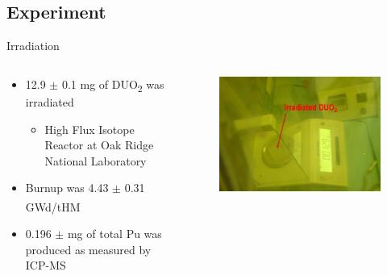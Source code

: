 \documentclass{beamer}
\newcommand{\tss}{\textsuperscript}
\newcommand{\tsbs}{\textsubscript}
\begin{document}
\subsection{Experiment}
\begin{frame}{Irradiation}
  \begin{columns}
    \begin{column}{0.5\textwidth}
      \vspace{-1cm}
      \begin{itemize}
      \item{12.9 $\pm$ 0.1 mg of DUO\tsbs{2} was irradiated}
        \begin{itemize}
        \item{High Flux Isotope Reactor at Oak Ridge National Laboratory}
        \end{itemize}
      \item{Burnup was 4.43 $\pm$ 0.31 GWd/tHM\tss{\cite{swinney2015experimental}}}
      \item{0.196 $\pm$ mg of total Pu was produced as measured by ICP-MS}
      \end{itemize}
    \end{column}
    \begin{column}{0.5\textwidth}
      \begin{figure}[H]
        \vspace*{-1cm}
        \begin{center}
	   \includegraphics[scale = 0.4]{figures/irradiated}
	\end{center}
      \end{figure}
    \end{column}
  \end{columns}  
  \end{frame}
\end{document}
